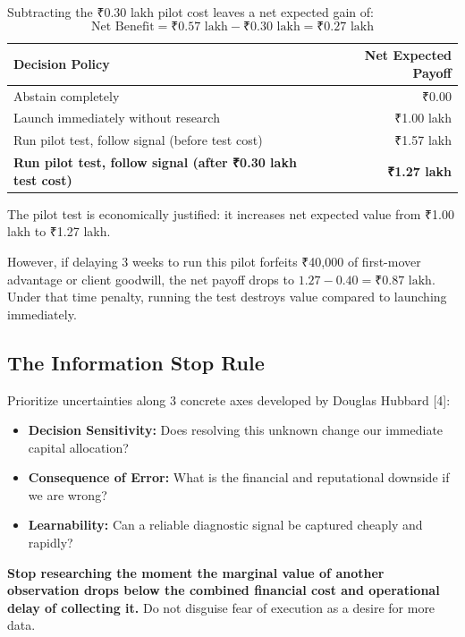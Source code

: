 Subtracting the ₹0.30 lakh pilot cost leaves a net expected gain of:
\begin{equation*}
\text{Net Benefit} = \text{₹}0.57\text{ lakh} - \text{₹}0.30\text{ lakh} = \text{₹}0.27\text{ lakh}
\end{equation*}

\begin{tcolorbox}[
  enhanced,
  colback=BayesSurface!60,
  colframe=BayesBorder,
  boxrule=0.5pt,
  arc=3pt,
  left=3pt,right=3pt,top=3pt,bottom=3pt,
  boxsep=1pt
]
\scriptsize
\begin{tabularx}{\linewidth}{X r}
\toprule
\textbf{Decision Policy} & \textbf{Net Expected Payoff} \\
\midrule
Abstain completely & ₹0.00 \\
Launch immediately without research & ₹1.00 lakh \\
Run pilot test, follow signal (before test cost) & ₹1.57 lakh \\
\textbf{Run pilot test, follow signal (after ₹0.30 lakh test cost)} & \textbf{₹1.27 lakh} \\
\bottomrule
\end{tabularx}
\end{tcolorbox}

The pilot test is economically justified: it increases net expected value from ₹1.00 lakh to ₹1.27 lakh.

However, if delaying 3 weeks to run this pilot forfeits ₹40,000 of first-mover advantage or client goodwill, the net payoff drops to $1.27 - 0.40 = \text{₹}0.87\text{ lakh}$. Under that time penalty, running the test destroys value compared to launching immediately.

\subsection{The Information Stop Rule}

Prioritize uncertainties along 3 concrete axes developed by Douglas Hubbard [4]:
\begin{itemize}[leftmargin=10pt,itemsep=1pt,topsep=1pt]
  \item \textbf{Decision Sensitivity:} Does resolving this unknown change our immediate capital allocation?
  \item \textbf{Consequence of Error:} What is the financial and reputational downside if we are wrong?
  \item \textbf{Learnability:} Can a reliable diagnostic signal be captured cheaply and rapidly?
\end{itemize}

\textbf{Stop researching the moment the marginal value of another observation drops below the combined financial cost and operational delay of collecting it.} Do not disguise fear of execution as a desire for more data.
